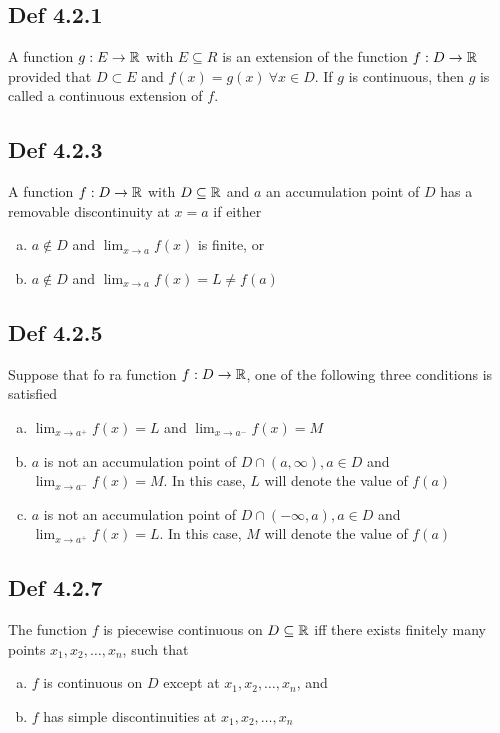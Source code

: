 \subsection*{Def 4.2.1}
    A function $g : E \to \mathbb{R}$ with $E \subseteq R$ is an extension of the function $f:D \to \mathbb{R}$ provided that $D \subset E$ and $f (x) = g(x) \ \forall x \in D$. If $g$ is continuous, then $g$ is called a continuous extension of $f$.

\subsection*{Def 4.2.3}
    A function $f : D \to \mathbb{R}$ with $D \subseteq \mathbb{R}$ and $a$ an accumulation point of $D$ has a removable discontinuity at $x = a$ if either
    \begin{enumerate}[(a)]
        \item $a \not \in D$ and $\lim_{x \to a} f(x)$ is finite, or
        \item $a \not \in D$ and $\lim_{x \to a} f(x) = L \not= f(a)$
    \end{enumerate}

\subsection*{Def 4.2.5}
    Suppose that fo ra function $f : D \to \mathbb{R}$, one of the following three conditions is satisfied 
    \begin{enumerate}[(a)]
        \item $\lim_{x \to a^{+}} f(x) = L$ and $\lim_{x \to a^{-}} f(x) = M$ 
	\item $a$ is not an accumulation point of $D \cap (a, \infty), a \in D$ and $\lim_{x \to a^{-}} f(x) = M$. In this case, $L$ will denote the value of $f(a)$
	\item $a$ is not an accumulation point of $D \cap (- \infty, a), a \in D$ and $\lim_{x \to a^{+}} f(x) = L$. In this case, $M$ will denote the value of $f(a)$
    \end{enumerate}

\subsection*{Def 4.2.7}
    The function $f$ is piecewise continuous on $D \subseteq \mathbb{R}$ iff there exists finitely many points $x_1, x_2, \ldots, x_{n}$, such that 
    \begin{enumerate}[(a)]
        \item $f$ is continuous on $D$ except at $x_1, x_2, \ldots, x_{n}$, and
	\item $f$ has simple discontinuities at $x_1, x_2, \ldots, x_{n}$
    \end{enumerate}

